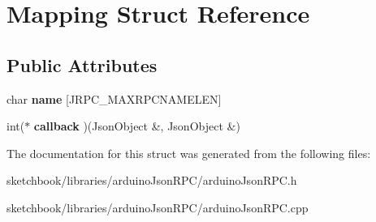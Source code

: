 \hypertarget{structMapping}{}\section{Mapping Struct Reference}
\label{structMapping}
\subsection*{Public Attributes}
\begin{DoxyCompactItemize}
\item 
\mbox{\label{structMapping_a6fed520d4d18b07e6f435751f70fa31d}} 
char {\bfseries name} \mbox{[}J\+R\+P\+C\+\_\+\+M\+A\+X\+R\+P\+C\+N\+A\+M\+E\+L\+EN\mbox{]}
\item 
\mbox{\label{structMapping_ac186e72e69faab3f56dc1e414986da72}} 
int($\ast$ {\bfseries callback} )(Json\+Object \&, Json\+Object \&)
\end{DoxyCompactItemize}


The documentation for this struct was generated from the following files\+:\begin{DoxyCompactItemize}
\item 
sketchbook/libraries/arduino\+Json\+R\+P\+C/arduino\+Json\+R\+P\+C.\+h\item 
sketchbook/libraries/arduino\+Json\+R\+P\+C/arduino\+Json\+R\+P\+C.\+cpp\end{DoxyCompactItemize}

